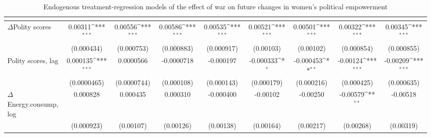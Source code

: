 \begin{table}[htbp]\centering
\def\sym#1{\ifmmode^{#1}\else\(^{#1}\)\fi}
\caption{Endogenous treatment-regression models of the effect of war on future changes in women’s political empowerment\label{ivpolempowerment}}
\begin{tabular}{l*{8}{c}}
\hline\hline
                    &&&&&&&&\\
\hline
$\Delta$Polity scores        &     0.00311\sym{***}&     0.00556\sym{***}&     0.00586\sym{***}&     0.00535\sym{***}&     0.00521\sym{***}&     0.00501\sym{***}&     0.00322\sym{***}&     0.00345\sym{***}\\
                    &  (0.000434)         &  (0.000753)         &  (0.000883)         &  (0.000917)         &   (0.00103)         &   (0.00102)         &  (0.000854)         &  (0.000855)         \\
[1em]
Polity scores, lag           &    0.000135\sym{***}&   0.0000566         &  -0.0000718         &   -0.000197         &   -0.000333\sym{*}  &   -0.000453\sym{**} &    -0.00124\sym{***}&    -0.00209\sym{***}\\
                    & (0.0000465)         & (0.0000744)         &  (0.000108)         &  (0.000143)         &  (0.000179)         &  (0.000216)         &  (0.000425)         &  (0.000635)         \\
[1em]
$\Delta$Energy.consump,log             &    0.000828         &    0.000435         &    0.000310         &   -0.000400         &    -0.00102         &    -0.00250         &    -0.00579\sym{**} &    -0.00518         \\
                    &  (0.000923)         &   (0.00107)         &   (0.00126)         &   (0.00138)         &   (0.00164)         &   (0.00217)         &   (0.00268)         &   (0.00319)         \\

\end{tabular}
\end{table}
